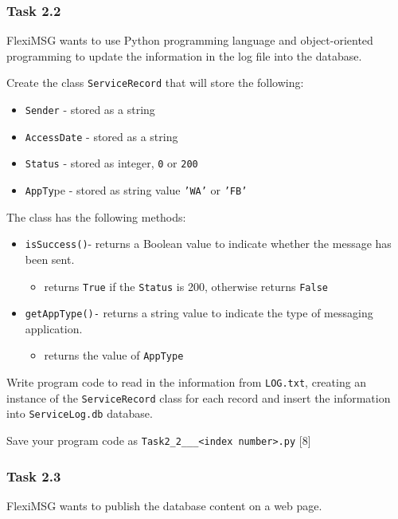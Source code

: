 \subsubsection*{Task 2.2 }

FlexiMSG wants to use Python programming language and object-oriented
programming to update the information in the log file into the database.

Create the class \texttt{ServiceRecord} that will store the following: 
\begin{itemize}
\item \texttt{Sender} - stored as a string 
\item \texttt{AccessDate} - stored as a string 
\item \texttt{Status} - stored as integer, \texttt{0} or \texttt{200} 
\item \texttt{AppTy}pe - stored as string value \texttt{'WA'} or \texttt{'FB'} 
\end{itemize}
The class has the following methods:
\begin{itemize}
\item \texttt{isSuccess()}- returns a Boolean value to indicate whether
the message has been sent. 
\begin{itemize}
\item returns \texttt{True} if the \texttt{Status} is 200, otherwise returns
\texttt{False} 
\end{itemize}
\item \texttt{getAppType()-} returns a string value to indicate the type
of messaging application. 
\begin{itemize}
\item returns the value of \texttt{AppType} 
\end{itemize}
\end{itemize}
Write program code to read in the information from \texttt{LOG.txt},
creating an instance of the \texttt{ServiceRecord} class for each
record and insert the information into \texttt{ServiceLog.db} database. 

Save your program code as \texttt{Task2\_2\_<your name>\_<center number>\_<index
number>.py} \hfill{}{[}8{]}

\subsubsection*{Task 2.3 }

FlexiMSG wants to publish the database content on a web page. 

